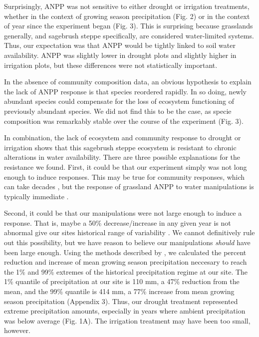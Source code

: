 \documentclass[fleqn,10pt]{wlpeerj} %
\begin{document}
Surprisingly, ANPP was not sensitive to either drought or irrigation
treatments, whether in the context of growing season precipitation (Fig.
2) or in the context of year since the experiment began (Fig. 3). This
is surprising because grasslands generally, and sagebrush steppe
specifically, are considered water-limited systems. Thus, our
expectation was that ANPP would be tightly linked to soil water
availability. ANPP was slightly lower in drought plots and slightly
higher in irrigation plots, but these differences were not statistically
important.

In the absence of community composition data, an obvious hypothesis to
explain the lack of ANPP response is that species reordered rapidly. In
so doing, newly abundant species could compensate for the loss of
ecosystem functioning of previously abundant species. We did not find
this to be the case, as specie composition was remarkably stable over
the course of the experiment (Fig. 3).

In combination, the lack of ecosystem and community response to drought
or irrigation shows that this sagebrush steppe ecosystem is resistant to
chronic alterations in water availability. There are three possible
explanations for the resistance we found. First, it could be that our
experiment simply was not long enough to induce responses. This may be
true for community responses, which can take decades \citep{Wilcox2016},
but the response of grassland ANPP to water manipulations is typically
immediate \citep[e.g.,][]{Hoover2014}.

Second, it could be that our manipulations were not large enough to
induce a response. That is, maybe a 50\% decrease/increase in any given
year is not abnormal give our sites historical range of variability
\citep{Knapp2017}. We cannot definitively rule out this possibility, but
we have reason to believe our manipulations \emph{should} have been
large enough. Using the methods described by \citet{Lemoine2016}, we
calculated the percent reduction and increase of mean growing season
precipitation neccesary to reach the 1\% and 99\% extremes of the
historical precipitation regime at our site. The 1\% quantile of
precipitation at our site is 110 mm, a 47\% reduction from the mean, and
the 99\% quantile is 414 mm, a 77\% increase from mean growing season
precipitation (Appendix 3). Thus, our drought treatment represented
extreme precipitation amounts, especially in years where ambient
precipitation was below average (Fig. 1A). The irrigation treatment may
have been too small, however.
\end{document}
